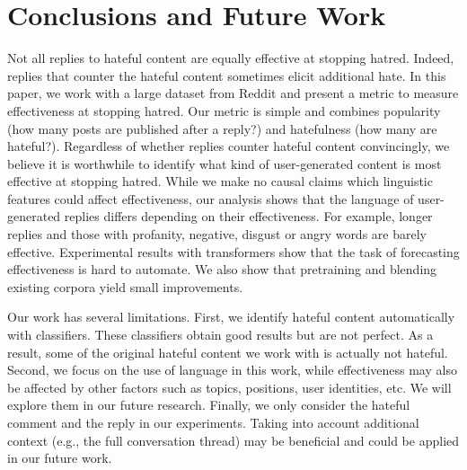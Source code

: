 \documentclass[11pt]{article}
\begin{document}
\section{Conclusions and Future Work}
Not all replies to hateful content are equally effective at stopping hatred.
Indeed, replies that counter the hateful content sometimes elicit additional hate.
In this paper, we work with a large dataset from Reddit and present a metric to measure effectiveness at stopping hatred.
Our metric is simple and combines popularity (how many posts are published after a reply?)
and hatefulness (how many are hateful?).
Regardless of whether replies counter hateful content convincingly,
we believe it is worthwhile to identify what kind of user-generated content is most effective at stopping hatred.
While we make no causal claims which linguistic features could affect effectiveness, 
our analysis shows that the language of user-generated replies differs depending on their effectiveness.
For example,
longer replies and those with profanity, negative, disgust or angry words are barely effective.
Experimental results with transformers show that the task of forecasting effectiveness is hard to automate.
We also show that pretraining and blending existing corpora yield small improvements.

Our work has several limitations. 
First,  we identify hateful content automatically with classifiers.
These classifiers obtain good results but are not perfect.
As a result,
some of the original hateful content we work with is actually not hateful.
Second, we focus on the use of language in this work, while effectiveness may also be affected by other factors such as topics, positions, user identities, etc.
We will explore them in our future research.
Finally, we only consider the hateful comment and the reply in our experiments.
Taking into account additional context (e.g., the full conversation thread) may be beneficial and could be applied in our future work.





\appendix
\end{document}
